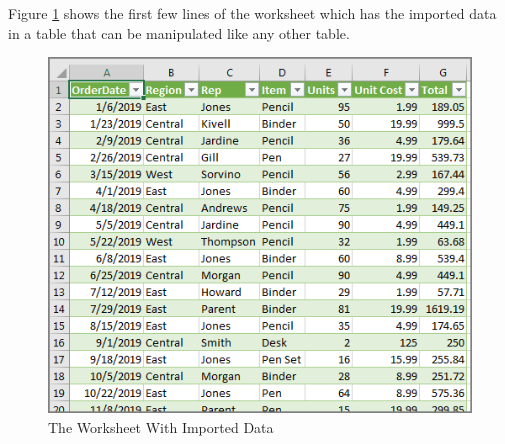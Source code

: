 
%

Figure \ref{07:fig10} shows the first few lines of the worksheet which has the imported data in a table that can be manipulated like any other table.

\begin{figure}[H]
	\centering
	\includegraphics[width=\maxwidth{.95\linewidth}]{gfx/ch07_fig10}
	\caption{The Worksheet With Imported Data}
	\label{07:fig10}
\end{figure}

